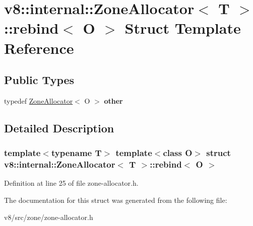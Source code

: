 \hypertarget{structv8_1_1internal_1_1ZoneAllocator_1_1rebind}{}\section{v8\+:\+:internal\+:\+:Zone\+Allocator$<$ T $>$\+:\+:rebind$<$ O $>$ Struct Template Reference}
\label{structv8_1_1internal_1_1ZoneAllocator_1_1rebind}
\subsection*{Public Types}
\begin{DoxyCompactItemize}
\item 
\mbox{\label{structv8_1_1internal_1_1ZoneAllocator_1_1rebind_a6fd0ca3581ca2c521efcd8e27b61caeb}} 
typedef \mbox{\hyperlink{classv8_1_1internal_1_1ZoneAllocator}{Zone\+Allocator}}$<$ O $>$ {\bfseries other}
\end{DoxyCompactItemize}


\subsection{Detailed Description}
\subsubsection*{template$<$typename T$>$\newline
template$<$class O$>$\newline
struct v8\+::internal\+::\+Zone\+Allocator$<$ T $>$\+::rebind$<$ O $>$}



Definition at line 25 of file zone-\/allocator.\+h.



The documentation for this struct was generated from the following file\+:\begin{DoxyCompactItemize}
\item 
v8/src/zone/zone-\/allocator.\+h\end{DoxyCompactItemize}
